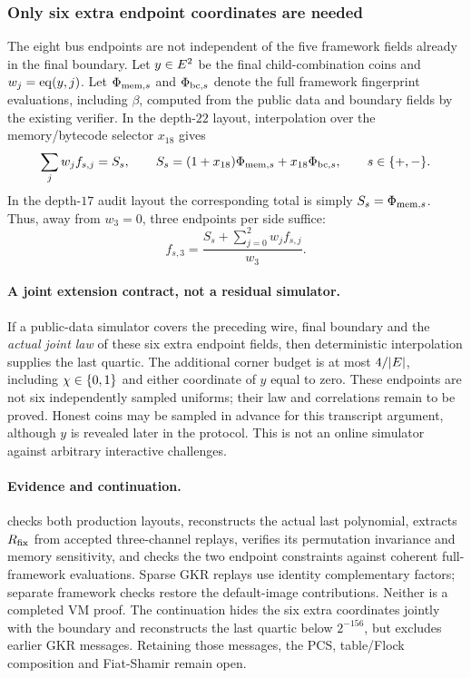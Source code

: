 \subsubsection{Only six extra endpoint coordinates are needed}

The eight bus endpoints are not independent of the five framework fields already in the final boundary. Let $y\in E^2$ be the final child-combination coins and $w_j=\operatorname{eq}(y,j)$. Let $\Phi_{{\rm mem},s}$ and $\Phi_{{\rm bc},s}$ denote the full framework fingerprint evaluations, including $\beta$, computed from the public data and boundary fields by the existing verifier. In the depth-$22$ layout, interpolation over the memory/bytecode selector $x_{18}$ gives
\[
 \sum_j w_j f_{s,j}=S_s,
 \qquad S_s=(1+x_{18})\Phi_{{\rm mem},s}+x_{18}\Phi_{{\rm bc},s},
 \qquad s\in\{+,-\}.
\]
In the depth-$17$ audit layout the corresponding total is simply $S_s=\Phi_{{\rm mem},s}$. Thus, away from $w_3=0$, three endpoints per side suffice:
\[
 f_{s,3}=\frac{S_s+\sum_{j=0}^2w_jf_{s,j}}{w_3}.
\]

\paragraph{A joint extension contract, not a residual simulator.} If a public-data simulator covers the preceding wire, final boundary and the \emph{actual joint law} of these six extra endpoint fields, then deterministic interpolation supplies the last quartic. The additional corner budget is at most $4/|E|$, including $\chi\in\{0,1\}$ and either coordinate of $y$ equal to zero. These endpoints are not six independently sampled uniforms; their law and correlations remain to be proved. Honest coins may be sampled in advance for this transcript argument, although $y$ is revealed later in the protocol. This is not an online simulator against arbitrary interactive challenges.

\paragraph{Evidence and continuation.}  checks both production layouts, reconstructs the actual last polynomial, extracts $R_{\rm fix}$ from accepted three-channel replays, verifies its permutation invariance and memory sensitivity, and checks the two endpoint constraints against coherent full-framework evaluations. Sparse GKR replays use identity complementary factors; separate framework checks restore the default-image contributions. Neither is a completed VM proof. The continuation  hides the six extra coordinates jointly with the boundary and reconstructs the last quartic below $2^{-156}$, but excludes earlier GKR messages. Retaining those messages, the PCS, table/Flock composition and Fiat-Shamir remain open.

